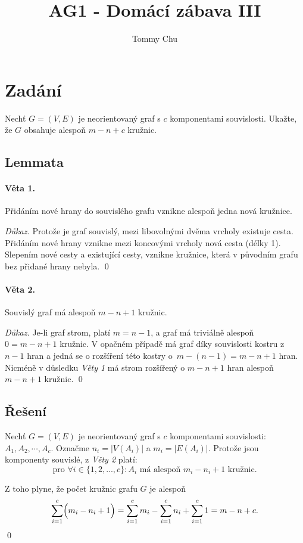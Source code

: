 \documentclass{article}
\title{AG1 - Domácí zábava III}
\author{Tommy Chu}
\date{}
\begin{document}
\maketitle

\section{Zadání}

Nechť $G = (V, E)$ je neorientovaný graf s $c$ komponentami souvislosti. Ukažte, že $G$ obsahuje alespoň $m - n + c$ kružnic.

\subsection*{Lemmata}

\paragraph*{Věta 1.} Přidáním nové hrany do souvislého grafu vznikne alespoň jedna nová kružnice.

\textit{Důkaz.} Protože je graf souvislý, mezi libovolnými dvěma vrcholy existuje cesta. Přidáním nové hrany vznikne mezi koncovými vrcholy nová cesta (délky 1). Slepením nové cesty a existující cesty, vznikne kružnice, která v původním grafu bez přidané hrany nebyla.
\qed

\paragraph*{Věta 2.} Souvislý graf má alespoň $m - n + 1$ kružnic.

\textit{Důkaz.}
Je-li graf strom, platí $m = n - 1$, a graf má triviálně alespoň $0 = m - n + 1$ kružnic. V opačném případě má graf díky souvislosti kostru z $n-1$ hran a jedná se o rozšíření této kostry o~$m - (n - 1) = m - n + 1$ hran. Nicméně v důsledku \textit{Věty 1} má strom rozšířený o $m - n + 1$ hran alespoň $m - n + 1$ kružnic.
\qed

\subsection*{Řešení}

Nechť $G = (V, E)$ je neorientovaný graf s $c$ komponentami souvislosti: $A_1, A_2, \cdots, A_c$. Označme $n_i = |V(A_i)|$ a $m_i = |E(A_i)|$. Protože jsou komponenty souvislé, z \textit{Věty 2} platí:
\[
    \text{pro $\forall i \in \{1, 2, ..., c\}$} \colon A_i \text{ má alespoň } m_i - n_i + 1 \text{ kružnic}.
\]

Z toho plyne, že počet kružnic grafu $G$ je alespoň
\begin{align*}
    \sum_{i=1}^{c} \Bigl( m_i - n_i + 1 \Bigr) = \sum_{i=1}^{c} m_i - \sum_{i=1}^{c} n_i + \sum_{i=1}^{c} 1 = m - n + c.
\end{align*}
\qed
\end{document}
